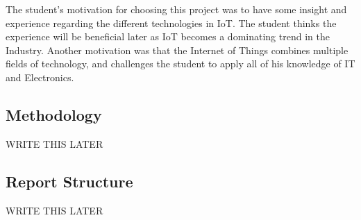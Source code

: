 The student's motivation for choosing this project was to have some insight and experience regarding the different technologies in IoT. The student thinks the experience will be beneficial later as IoT becomes a dominating trend in the Industry. Another motivation was that the Internet of Things combines multiple fields of technology, and challenges the student to apply all of his knowledge of IT and Electronics.
\newpage

\subsection{Methodology}
WRITE THIS LATER
\subsection{Report Structure}

WRITE THIS LATER 